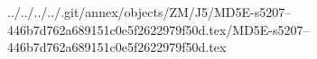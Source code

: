 ../../../../.git/annex/objects/ZM/J5/MD5E-s5207--446b7d762a689151c0e5f2622979f50d.tex/MD5E-s5207--446b7d762a689151c0e5f2622979f50d.tex